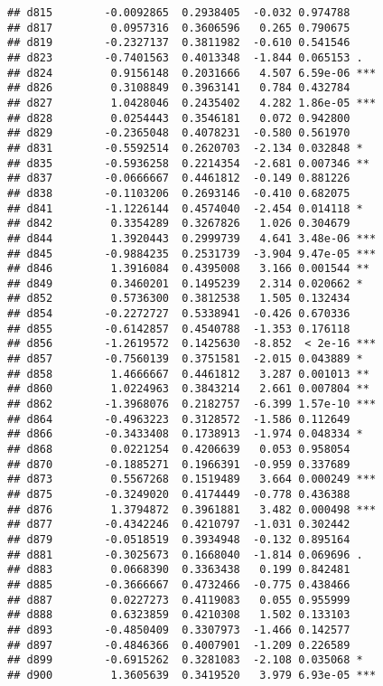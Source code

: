 \documentclass[
]{article}
\begin{document}
\begin{verbatim}
## d815        -0.0092865  0.2938405  -0.032 0.974788    
## d817         0.0957316  0.3606596   0.265 0.790675    
## d819        -0.2327137  0.3811982  -0.610 0.541546    
## d823        -0.7401563  0.4013348  -1.844 0.065153 .  
## d824         0.9156148  0.2031666   4.507 6.59e-06 ***
## d826         0.3108849  0.3963141   0.784 0.432784    
## d827         1.0428046  0.2435402   4.282 1.86e-05 ***
## d828         0.0254443  0.3546181   0.072 0.942800    
## d829        -0.2365048  0.4078231  -0.580 0.561970    
## d831        -0.5592514  0.2620703  -2.134 0.032848 *  
## d835        -0.5936258  0.2214354  -2.681 0.007346 ** 
## d837        -0.0666667  0.4461812  -0.149 0.881226    
## d838        -0.1103206  0.2693146  -0.410 0.682075    
## d841        -1.1226144  0.4574040  -2.454 0.014118 *  
## d842         0.3354289  0.3267826   1.026 0.304679    
## d844         1.3920443  0.2999739   4.641 3.48e-06 ***
## d845        -0.9884235  0.2531739  -3.904 9.47e-05 ***
## d846         1.3916084  0.4395008   3.166 0.001544 ** 
## d849         0.3460201  0.1495239   2.314 0.020662 *  
## d852         0.5736300  0.3812538   1.505 0.132434    
## d854        -0.2272727  0.5338941  -0.426 0.670336    
## d855        -0.6142857  0.4540788  -1.353 0.176118    
## d856        -1.2619572  0.1425630  -8.852  < 2e-16 ***
## d857        -0.7560139  0.3751581  -2.015 0.043889 *  
## d858         1.4666667  0.4461812   3.287 0.001013 ** 
## d860         1.0224963  0.3843214   2.661 0.007804 ** 
## d862        -1.3968076  0.2182757  -6.399 1.57e-10 ***
## d864        -0.4963223  0.3128572  -1.586 0.112649    
## d866        -0.3433408  0.1738913  -1.974 0.048334 *  
## d868         0.0221254  0.4206639   0.053 0.958054    
## d870        -0.1885271  0.1966391  -0.959 0.337689    
## d873         0.5567268  0.1519489   3.664 0.000249 ***
## d875        -0.3249020  0.4174449  -0.778 0.436388    
## d876         1.3794872  0.3961881   3.482 0.000498 ***
## d877        -0.4342246  0.4210797  -1.031 0.302442    
## d879        -0.0518519  0.3934948  -0.132 0.895164    
## d881        -0.3025673  0.1668040  -1.814 0.069696 .  
## d883         0.0668390  0.3363438   0.199 0.842481    
## d885        -0.3666667  0.4732466  -0.775 0.438466    
## d887         0.0227273  0.4119083   0.055 0.955999    
## d888         0.6323859  0.4210308   1.502 0.133103    
## d893        -0.4850409  0.3307973  -1.466 0.142577    
## d897        -0.4846366  0.4007901  -1.209 0.226589    
## d899        -0.6915262  0.3281083  -2.108 0.035068 *  
## d900         1.3605639  0.3419520   3.979 6.93e-05 ***

\end{verbatim}
\end{document}
